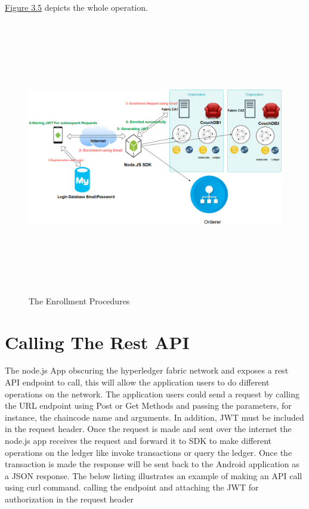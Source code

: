 \hyperref[fig:enrollmentproc]{Figure 3.5} depicts the whole operation.  
\ \\
 \begin{figure}[H]
\includegraphics[width=15cm,height=12cm]{images/enrollmentproc.jpg}
\caption{The Enrollment Procedures}
\label{fig:enrollmentproc}
\end{figure}

  
\section{Calling The Rest API}

The node.js App obscuring the hyperledger fabric network and exposes a rest API endpoint to call, this will allow the application users to do different operations on the network. 
The application users could send a request by calling the URL endpoint using Post or Get Methods and passing the parameters, for instance, the chaincode name and arguments. In addition, JWT must be included in the request header. Once the request is made and sent over the internet the node.js app receives the request and forward it to SDK to make different operations on the ledger like invoke transactions or query the ledger. 
Once the transaction is made the response will be sent back to the Android application as a JSON response. The below listing illustrates an example of making an API call using curl command. calling the endpoint and attaching the JWT for authorization in the request header   

